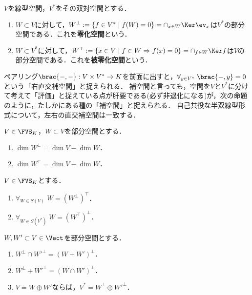 \documentclass[uplatex, dvipdfmx]{jsreport}
\begin{document}
\begin{proposition}
    $V$を線型空間，$V^*$をその双対空間とする．
    \begin{enumerate}
        \item $W\subset V$に対して，$W^\bot:=\{f\in V^*\mid f(W)=0\}=\cap_{x\in W}\Ker\ev_x$は$V^*$の部分空間である．これを\textbf{零化空間}という．
        \item $W\subset V^*$に対して，$W^\top:=\{x\in V\mid f\in W\Rightarrow f(x)=0\}=\cap_{f\in W}\Ker f$は$V$の部分空間である．これを\textbf{被零化空間}という．
    \end{enumerate}
\end{proposition}
\begin{remark}
    ペアリング$\brac{-,-}:V\times V^*\to K$を前面に出すと，$\forall_{y\in V^*}\;\brac{-,y}=0$という「右直交補空間」と捉えられる．
    補空間と言っても，空間を$V$と$V^*$に分けて考えて「評価」と捉えている点が肝要である(必ず非退化になる)が，次の命題のように，たしかにある種の「補空間」と捉えられる．
    自己共役な半双線型形式について，左右の直交補空間は一致する．
\end{remark}

\begin{proposition}[FVSでは零化空間は補空間を与える]
    $V\in\FVS_K$，$W\subset V$を部分空間とする．
    \begin{enumerate}
        \item $\dim W^\perp=\dim V-\dim W$．
        \item $\dim W^\top=\dim V-\dim W$．
    \end{enumerate}
\end{proposition}

\begin{corollary}[TVSでは再零化空間は元に戻る]
    $V\in\FVS_K$とする．
    \begin{enumerate}
        \item $\forall_{W\in S(V)}\;W=(W^\perp)^\top$．
        \item $\forall_{W\in S(V^*)}\;W=(W^\top)^\perp$．
    \end{enumerate}
\end{corollary}

\begin{proposition}[双対空間の零化空間への分解]\label{prop-annihilator-space-and-direct-sum}
    $W,W'\subset V\in\Vect$を部分空間とする．
    \begin{enumerate}
        \item $W^\bot\cap W'^\bot=(W+W')^\bot$．
        \item $W^\bot+W'^\bot=(W\cap W')^\bot$．
        \item $V=W\oplus W'$ならば，$V^*=W^\bot\oplus W'^\bot$．
    \end{enumerate}
\end{proposition}
\end{document}
